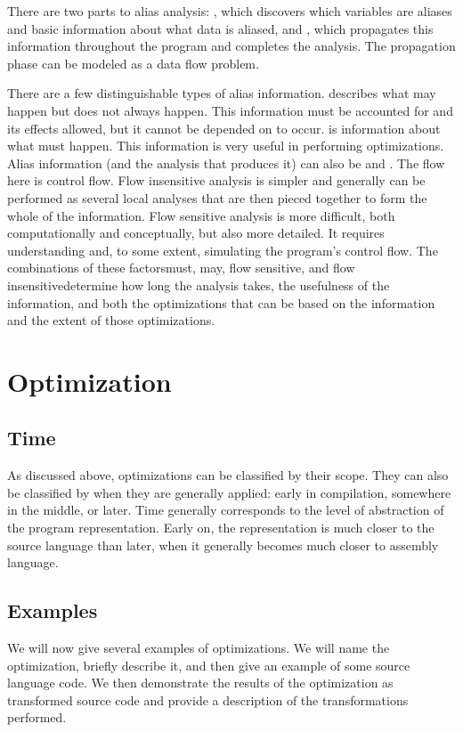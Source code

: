There are two parts to alias analysis: , which discovers which variables are aliases and basic information about what data is aliased, and , which propagates this information throughout the program and completes the analysis. The propagation phase can be modeled as a data flow problem.

There are a few distinguishable types of alias information.  describes what may happen but does not always happen. This information must be accounted for and its effects allowed, but it cannot be depended on to occur.  is information about what must happen. This information is very useful in performing optimizations. Alias information (and the analysis that produces it) can also be  and . The flow here is control flow. Flow insensitive analysis is simpler and generally can be performed as several local analyses that are then pieced together to form the whole of the information. Flow sensitive analysis is more difficult, both computationally and conceptually, but also more detailed. It requires understanding and, to some extent, simulating the program's control flow. The combinations of these factors\empause must, may, flow sensitive, and flow insensitive\empause determine how long the analysis takes, the usefulness of the information, and both the optimizations that can be based on the information and the extent of those optimizations.

\section{Optimization}
\subsection{Time}
As discussed above, optimizations can be classified by their scope. They can also be classified by when they are generally applied: early in compilation, somewhere in the middle, or later. Time generally corresponds to the level of abstraction of the program representation. Early on, the representation is much closer to the source language than later, when it generally becomes much closer to assembly language.

\subsection{Examples}
We will now give several examples of optimizations. We will name the optimization, briefly describe it, and then give an example of some source language code. We then demonstrate the results of the optimization as transformed source code and provide a description of the transformations performed.
